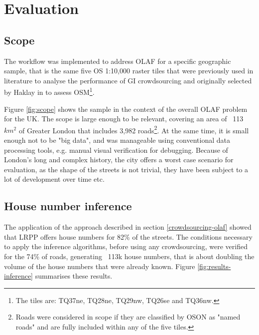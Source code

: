 \section{Evaluation}

\subsection{Scope}

The workflow was implemented to address OLAF for a specific geographic sample, that is the same five OS 1:10,000 raster tiles that were previously used in literature to analyse the performance of GI crowdsourcing and originally selected by Haklay in \cite{Haklay:2010vs} to assess OSM\footnote{The tiles are: TQ37ne, TQ28ne, TQ29nw, TQ26se and TQ36nw.}.

Figure \ref{fig:scope} shows the sample in the context of the overall OLAF problem for the UK. The scope is large enough to be relevant, covering an area of ~113 $ km^2 $ of Greater London that includes 3,982 roads\footnote{Roads were considered in scope if they are classified by OSON as "named roads" and are fully included within any of the five tiles.}. At the same time, it is small enough not to be "big data", and was manageable using conventional data processing tools, e.g. manual visual verification for debugging. Because of London's long and complex history, the city offers a worst case scenario for evaluation, as the shape of the streets is not trivial, they have been subject to a lot of development over time etc. 

\subsection{House number inference}

The application of the approach described in section \ref{crowdsourcing-olaf} showed that LRPP offers house numbers for 82\% of the streets. The conditions necessary to apply the inference algorithms, before using any crowdsourcing, were verified for the 74\% of roads, generating ~113k house numbers, that is about doubling the volume of the house numbers that were already known. Figure \ref{fig:results-inference} summarises these results.

\begin{figure}[!ht]
    \begin{floatrow}
   \end{floatrow}
\end{figure}

